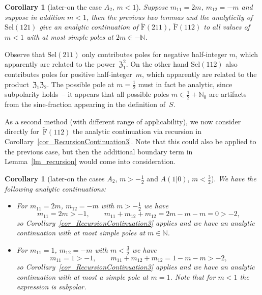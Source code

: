 \documentclass[pdftex]{sigma}%
\numberwithin{equation}{section}
\newtheorem{cor}[teo]{Corollary}
\newcommand{\N}{\mathbb{N}}
\newcommand{\zem}{\mathfrak{Z}}
\newcommand{\Sel}{\mathrm{Sel}}
\newcommand{\rFp}{\tilde{\mathrm{F}}}
\begin{document}
\begin{cor}[later-on the case $A_2$, $m<1$]\label{cor_A2Method1}
	Suppose $m_{11}=2m$, $m_{12}=-m$ and suppose in addition $m<1$, then the previous two lemmas and the analyticity of $\Sel(121)$ give an analytic continuation of $\rFp(211)$, $\rFp(112)$ to all values of $m<1$ with at most simple poles at $2m\in-\N$.
\end{cor}
Observe that $\Sel(211)$ only contributes poles for negative half-integer $m$, which apparently are related to the power~$\zem_1^2$. On the other hand $\Sel(112)$ also contributes poles for positive half-integer~$m$, which apparently are related to the product~$\zem_1\zem_2$. The possible pole at $m=\frac{1}{2}$ must in fact be analytic, since subpolarity holds~-- it appears that all possible poles $m\in\frac{1}{2}+\N_0$ are artifacts from the sine-fraction appearing in the definition of~$S$.

As a second method (with different range of applicability), we now consider directly for~$\rFp(112)$ the analytic continuation via recursion in Corollary~\ref{cor_RecursionContinuation3}. Note that this could also be applied to the previous case, but then the additional boundary term in Lemma~\ref{lm_recursion} would come into consideration.
\begin{cor}[later-on the cases $A_2$, $m>-\frac{1}{2}$ and $A(1|0)$, $m<\frac{3}{2}$]\label{cor_A2Method2}
	We have the following analytic continuations:
\begin{itemize}\itemsep=0pt
	\item For $m_{11}=2m$, $m_{12}=-m$ with $m>-\frac{1}{2}$ we have \[m_{11}=2m>-1,\qquad
	m_{11}+m_{12}+m_{12}=2m-m-m=0>-2,\]
	so Corollary~{\rm \ref{cor_RecursionContinuation3}} applies and we have an analytic continuation with at most simple poles at $m\in\N$.
	\item For $m_{11}=1$, $m_{12}=-m$ with $m<\frac{3}{2}$ we have
	\[m_{11}=1>-1,\qquad
	m_{11}+m_{12}+m_{12}=1-m-m>-2,\]
	so Corollary~{\rm \ref{cor_RecursionContinuation3}} applies and we have an analytic continuation with at most a simple pole at $m=1$. Note that for $m<1$ the expression is subpolar.
\end{itemize}
\end{cor}
\end{document}
